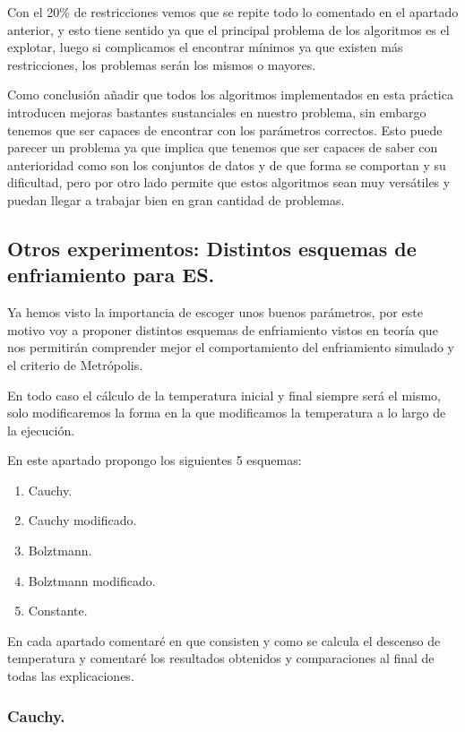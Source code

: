 \documentclass[12pt, spanish]{article}
\begin{document}
Con el 20\% de restricciones vemos que se repite todo lo comentado en el apartado anterior, y esto tiene sentido ya que el principal problema de los algoritmos es el explotar, luego si complicamos el encontrar mínimos ya que existen más restricciones, los problemas serán los mismos o mayores.


Como conclusión añadir que todos los algoritmos implementados en esta práctica introducen mejoras bastantes sustanciales en nuestro problema, sin embargo tenemos que ser capaces de encontrar con los parámetros correctos. Esto puede parecer un problema ya que implica que tenemos que ser capaces de saber con anterioridad como son los conjuntos de datos y de que forma se comportan y su dificultad, pero por otro lado permite que estos algoritmos sean muy versátiles y puedan llegar a trabajar bien en gran cantidad de problemas.

\subsection{Otros experimentos: Distintos esquemas de enfriamiento para ES.}

Ya hemos visto la importancia de escoger unos buenos parámetros, por este motivo voy a proponer distintos esquemas de enfriamiento vistos en teoría que nos permitirán comprender mejor el comportamiento del enfriamiento simulado y el criterio de Metrópolis.

En todo caso el cálculo de la temperatura inicial y final siempre será el mismo, solo modificaremos la forma en la que modificamos la temperatura a lo largo de la ejecución.

En este apartado propongo los siguientes 5 esquemas:

\begin{enumerate}
	\item Cauchy.
	\item Cauchy modificado.
	\item Bolztmann.
	\item Bolztmann modificado.
	\item Constante.
\end{enumerate}

En cada apartado comentaré en que consisten y como se calcula el descenso de temperatura y comentaré los resultados obtenidos y comparaciones al final de todas las explicaciones.

\subsubsection{Cauchy.}
\end{document}
